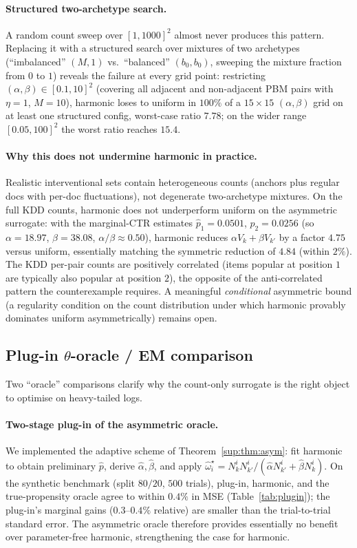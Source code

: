 \documentclass[11pt]{article}
\begin{document}
\paragraph{Structured two-archetype search.}
A random count sweep over $[1,1000]^2$ almost never produces this
pattern. Replacing it with a structured search over mixtures of two
archetypes (``imbalanced'' $(M,1)$ vs.\ ``balanced'' $(b_0,b_0)$,
sweeping the mixture fraction from $0$ to $1$) reveals the failure at
every grid point: restricting $(\alpha,\beta)\in[0.1,10]^2$ (covering
all adjacent and non-adjacent PBM pairs with $\eta=1$, $M=10$), harmonic
loses to uniform in $100\%$ of a $15\times15$ $(\alpha,\beta)$ grid on at
least one structured config, worst-case ratio $7.78$; on the wider range
$[0.05,100]^2$ the worst ratio reaches $15.4$.

\paragraph{Why this does not undermine harmonic in practice.}
Realistic interventional sets contain heterogeneous counts (anchors plus
regular docs with per-doc fluctuations), not degenerate two-archetype
mixtures. On the full KDD counts, harmonic does not underperform uniform
on the asymmetric surrogate: with the marginal-CTR estimates
$\hat p_1=0.0501$, $\hat p_2=0.0256$ (so $\alpha=18.97$, $\beta=38.08$,
$\alpha/\beta\approx0.50$), harmonic reduces
$\alpha V_k+\beta V_{k'}$ by a factor $4.75$ versus uniform, essentially
matching the symmetric reduction of $4.84$ (within $2\%$). The KDD
per-pair counts are positively correlated (items popular at position $1$
are typically also popular at position $2$), the opposite of the
anti-correlated pattern the counterexample requires. A meaningful
\emph{conditional} asymmetric bound (a regularity condition on the count
distribution under which harmonic provably dominates uniform
asymmetrically) remains open.

\subsection{Plug-in $\theta$-oracle / EM comparison}
\label{sec:plugin-oracle}

Two ``oracle'' comparisons clarify why the count-only surrogate is the
right object to optimise on heavy-tailed logs.

\paragraph{Two-stage plug-in of the asymmetric oracle.}
We implemented the adaptive scheme of Theorem~\ref{sup:thm:asym}: fit
harmonic to obtain preliminary $\hat p$, derive
$\hat\alpha,\hat\beta$, and apply
$\hat\omega_i^\star=N_k^iN_{k'}^i/(\hat\alpha N_{k'}^i+\hat\beta N_k^i)$.
On the synthetic benchmark (split $80/20$, $500$ trials), plug-in,
harmonic, and the true-propensity oracle agree to within $0.4\%$ in MSE
(Table~\ref{tab:plugin}); the plug-in's marginal gains ($0.3$--$0.4\%$
relative) are smaller than the trial-to-trial standard error. The
asymmetric oracle therefore provides essentially no benefit over
parameter-free harmonic, strengthening the case for harmonic.
\end{document}
